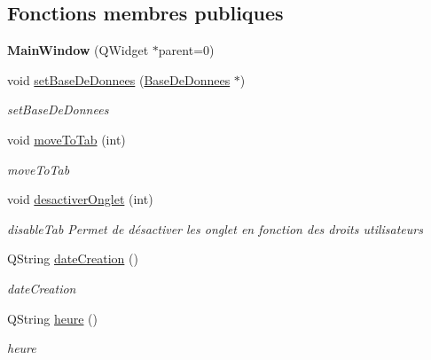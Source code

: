 \subsection*{Fonctions membres publiques}
\begin{DoxyCompactItemize}
\item 
\mbox{\label{class_main_window_a8b244be8b7b7db1b08de2a2acb9409db}} 
{\bfseries Main\+Window} (Q\+Widget $\ast$parent=0)
\item 
\mbox{\label{class_main_window_a819bd562262c9bc43627a54b6748c0c4}} 
void \mbox{\hyperlink{class_main_window_a819bd562262c9bc43627a54b6748c0c4}{set\+Base\+De\+Donnees}} (\mbox{\hyperlink{class_base_de_donnees}{Base\+De\+Donnees}} $\ast$)
\begin{DoxyCompactList}\small\item\em set\+Base\+De\+Donnees \end{DoxyCompactList}\item 
\mbox{\label{class_main_window_ad98be47de90e967d8b5a51b4815f4c94}} 
void \mbox{\hyperlink{class_main_window_ad98be47de90e967d8b5a51b4815f4c94}{move\+To\+Tab}} (int)
\begin{DoxyCompactList}\small\item\em move\+To\+Tab \end{DoxyCompactList}\item 
\mbox{\label{class_main_window_a025e31af5d47a5b1b448e52631d4e369}} 
void \mbox{\hyperlink{class_main_window_a025e31af5d47a5b1b448e52631d4e369}{desactiver\+Onglet}} (int)
\begin{DoxyCompactList}\small\item\em disable\+Tab Permet de désactiver les onglet en fonction des droits utilisateurs \end{DoxyCompactList}\item 
Q\+String \mbox{\hyperlink{class_main_window_ab960f7157f5e796f4d4aa8e4d33ce4a9}{date\+Creation}} ()
\begin{DoxyCompactList}\small\item\em date\+Creation \end{DoxyCompactList}\item 
Q\+String \mbox{\hyperlink{class_main_window_a67ddd81f2fe064ae24dd662f06111230}{heure}} ()
\begin{DoxyCompactList}\small\item\em heure \end{DoxyCompactList}\end{DoxyCompactItemize}

